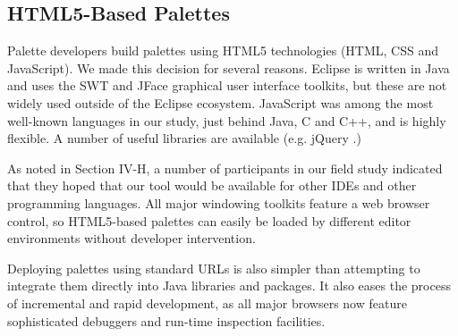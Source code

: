 \documentclass[10pt, conference, compsocconf]{IEEEtran}
\begin{document}
\subsection{HTML5-Based Palettes}
Palette developers build palettes using HTML5 technologies (HTML, CSS and JavaScript). We made this decision for several reasons. 
Eclipse is written in Java and uses the SWT and JFace graphical user interface toolkits, but these are not widely used outside of the Eclipse ecosystem. JavaScript was among the most well-known languages in our study, just behind Java, C and C++, and is highly flexible. A number of useful libraries are available (e.g. jQuery \cite{jQuery}.) 

As noted in Section IV-H, a number of participants in our field study indicated that they hoped that our tool would be available for other IDEs and other programming languages. All major windowing toolkits feature a web browser control, so HTML5-based palettes can easily be loaded by different editor environments without developer intervention.

Deploying palettes using standard URLs is also simpler than attempting to integrate them directly into Java libraries and packages. It also eases the process of incremental and rapid development, as all major browsers now feature sophisticated debuggers and run-time inspection facilities. 
\end{document}
